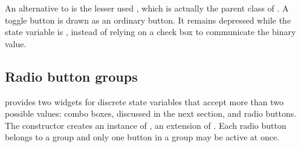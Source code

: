 An alternative to  is the lesser used
, which is actually the parent class of
. A toggle button is drawn as an ordinary
button. It remains depressed while the state variable is ,
instead of relying on a check box to communicate the binary value.

\subsection{Radio button groups}
\label{sec:RGtk2:gtkRadioButton}

\GTK\/ provides two widgets for discrete state variables that accept
more than two possible values: combo boxes, discussed in the next
section, and radio buttons. The  constructor
creates an instance of , an extension of
. Each radio button belongs to a group and only
one button in a group may be active at once.

